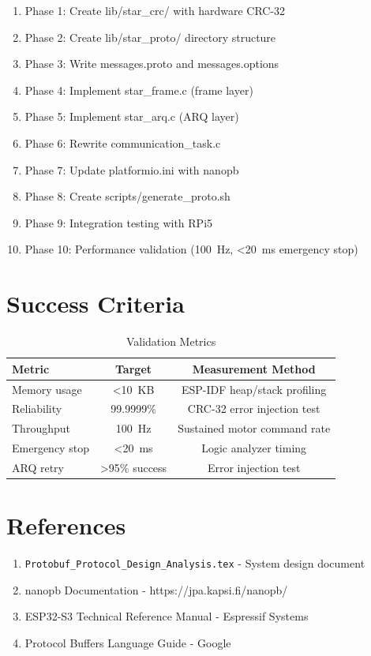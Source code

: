 \documentclass[12pt,letterpaper]{article}
\begin{document}
\begin{enumerate}[label=\protect\Large$\square$]
    \item Phase 1: Create lib/star\_crc/ with hardware CRC-32
    \item Phase 2: Create lib/star\_proto/ directory structure
    \item Phase 3: Write messages.proto and messages.options
    \item Phase 4: Implement star\_frame.c (frame layer)
    \item Phase 5: Implement star\_arq.c (ARQ layer)
    \item Phase 6: Rewrite communication\_task.c
    \item Phase 7: Update platformio.ini with nanopb
    \item Phase 8: Create scripts/generate\_proto.sh
    \item Phase 9: Integration testing with RPi5
    \item Phase 10: Performance validation (100~Hz, <20~ms emergency stop)
\end{enumerate}

\section{Success Criteria}

\begin{table}[h]
\centering
\caption{Validation Metrics}
\begin{tabular}{lcc}
\toprule
\textbf{Metric} & \textbf{Target} & \textbf{Measurement Method} \\
\midrule
Memory usage & <10~KB & ESP-IDF heap/stack profiling \\
Reliability & 99.9999\% & CRC-32 error injection test \\
Throughput & 100~Hz & Sustained motor command rate \\
Emergency stop & <20~ms & Logic analyzer timing \\
ARQ retry & >95\% success & Error injection test \\
\bottomrule
\end{tabular}
\end{table}

\section{References}

\begin{enumerate}
    \item \texttt{Protobuf\_Protocol\_Design\_Analysis.tex} - System design document
    \item nanopb Documentation - https://jpa.kapsi.fi/nanopb/
    \item ESP32-S3 Technical Reference Manual - Espressif Systems
    \item Protocol Buffers Language Guide - Google
\end{enumerate}
\end{document}
